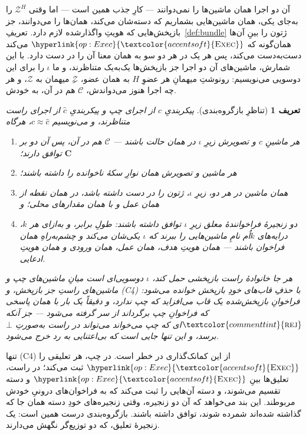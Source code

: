\documentclass[10pt,oneside,openany]{book}
\newcommand{\Cs}{\mathbf{C}}
\newcommand{\Corr}{\mathcal{C}}
\newcommand{\Zenv}{\mathcal{Z}}
\newcommand{\op}[1]{\textnormal{\textsc{#1}}}
\newcommand{\opl}[1]{\hyperlink{op:#1}{\textcolor{accentsoft}{\op{#1}}}}
\newcommand{\atom}[1]{\textcolor{commenttint}{\op{#1}}}
\newcommand{\rej}{\atom{rej}}
\newcommand{\none}{\bot}
\theoremstyle{accentdef}
\newtheorem{definition}{تعریف}[chapter]
\theoremstyle{accentplain}
\begin{document}
آن دو اجرا همان ماشین‌ها را نمی‌دوانند --- کارِ جذب همین است --- اما وقتی
$\Zenv^{H}$ را به‌جای یکی، همان ماشین‌هایی بشماریم که دسته‌شان می‌کند،
همان‌ها را می‌دوانند، جز بازپخش‌هایی که هویتِ واگذارشده لازم دارد.
تعریفِ~\ref{def:bundle} ژتون را بینِ آن‌ها همان‌گونه که $\opl{Exec}$
می‌کند دست‌به‌دست می‌کند، پس هر یک در هر دو سو به همان معنا آن را در دست
دارد. با این شمارش، ماشین‌های آن دو اجرا جز بازپخش‌ها یک‌به‌یک متناظرند، و
ما $\iota$ را برای این دوسویی می‌نویسیم: رونوشتِ میهمانِ هر عضوِ $H$ به
همان عضو، $\Zenv$ِ میهمان به $\Zenv$، و هر چه اجرا هنوز می‌دواندش،
$\Corr$ هم در آن، به خودش.

\begin{definition}[تناظرِ بازگروه‌بندی]\label{def:regcorr}
پیکربندیِ $c$ از اجرای چپ و پیکربندیِ $\hat c$ از اجرای راست
\emph{متناظرند}، و می‌نویسیم $c \approx \hat c$، هرگاه
\begin{enumerate}[label=(C\arabic*),leftmargin=3em]
  \item هر ماشینِ $c$ و تصویرش زیرِ $\iota$ در همان حالت باشند --- $\Corr$
        هم در آن، پس آن دو بر $\Cs$ توافق دارند؛
  \item هر ماشین و تصویرش همان نوارِ سکهٔ ناخوانده را داشته باشند؛
  \item همان ماشین در هر دو، زیرِ $\iota$، ژتون را در دست داشته باشد، در همان
        نقطه از همان عمل و با همان مقدارهای محلی؛ و
  \item دو زنجیرهٔ فراخوانندهٔ معلق زیرِ $\iota$ توافق داشته باشند: طولِ برابر، و
        به‌ازای هر $k$، درایه‌های $k$اُم نامِ ماشین‌هایی را ببرند که $\iota$
        یکی‌شان می‌کند و چشم‌به‌راهِ همان فراخوان باشند --- همان هویتِ هدف،
        همان عمل، همان ورودی و همان هویتِ ادعایی.
\end{enumerate}
هر جا خانوادهٔ راست بازپخشی حمل کند، $\iota$ دوسویی‌ای است میانِ ماشین‌های
چپ و ماشین‌های راستِ \emph{جز} بازپخش، و (C4) با حذفِ قاب‌های خودِ بازپخش
خوانده می‌شود: فراخوانِ بازپخش‌شده یک قاب می‌افزاید که چپ ندارد، و دقیقاً
یک بار با همان پاسخی که فراخوانِ چپ برگرداند از سر گرفته می‌شود --- جز
آنکه $\rej$ای که چپ می‌خواند می‌تواند در راست به‌صورتِ $\none$ برسد، و
این تنها جایی است که بی‌اعتنایی به رد خرج می‌شود.
\end{definition}

تنها (C4) از این کمانک‌گذاری در خطر است. در چپ، هر تعلیقی را $\opl{Exec}$
ثبت می‌کند؛ در راست، تعلیق‌ها بینِ $\opl{Exec}$ و دسته تقسیم می‌شوند، و
دسته آن‌هایی را ثبت می‌کند که به فراخوان‌های درونیِ خودش مربوطند. این بند
می‌خواهد که آن دو زنجیره، وقتی زنجیره‌های خودِ دسته همان جا که گذاشته
شده‌اند شمرده شوند، توافق داشته باشند. بازگروه‌بندی درست همین است: یک
زنجیرهٔ تعلیق، که دو توزیع‌گر نگهش می‌دارند.
\end{document}
